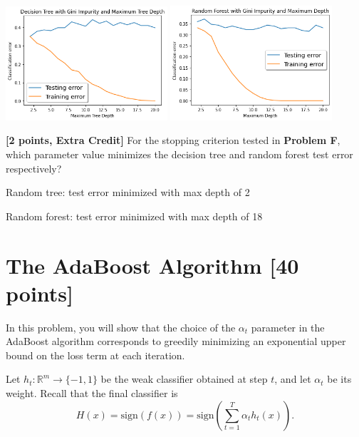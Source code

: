\begin{solution}
   
    \includegraphics[width=0.45\textwidth]{images/2f_tree.png}
    \includegraphics[width=0.45\textwidth]{images/2f_forest.png}
\end{solution}

\problem\textbf{[2 points, Extra Credit] }For the stopping criterion tested in \textbf{Problem F}, which parameter value minimizes the decision tree and random forest test error respectively? 

\begin{solution}

    Random tree: test error minimized with max depth of 2

    Random forest: test error minimized with max depth of 18
\end{solution}



\newpage
\section{The AdaBoost Algorithm [40 points]}

In this problem, you will show that the choice of the $\alpha_t$ parameter in
the AdaBoost algorithm corresponds to greedily minimizing an exponential upper
bound on the loss term at each iteration.

\problem[3]
Let $h_t: \mathbb{R}^m \rightarrow \{-1,1\}$ be the weak classifier obtained at step $t$, and let $\alpha_t$ be
its weight. Recall that the final classifier is $$H(x) = \text{sign}(f(x)) = \text{sign} \left(\sum\limits_{t=1}^T \alpha_{t}h_t(x) \right).$$


